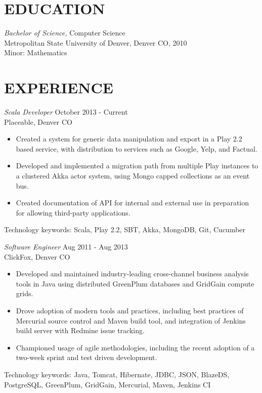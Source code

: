 \documentclass[line,margin]{res}
\begin{document}
\address{2020 Lawrence St \#830, Denver CO 80205}
\address{720-301-4407 / zoe@zgagnon.com}

 
\begin{resume}
 
\section{EDUCATION} {\sl Bachelor of Science,} Computer Science \\
               Metropolitan State University of Denver, Denver CO, 2010 \\
               Minor: Mathematics
 
\section{EXPERIENCE}
{\sl Scala Developer} \hfil October 2013 - Current\\
Placeable, Denver CO
\begin{itemize} \itemsep -2pt
\item Created a system for generic data manipulation and export in a Play 2.2 based service, with distribution to services such as Google, Yelp, and Factual.
\item Developed and implemented a migration path from multiple Play instances to a clustered Akka actor system, using Mongo
capped collections as an event bus.
\item Created documentation of API for internal and external use in preparation for allowing third-party applications.
\end{itemize}
Technology keywords: Scala, Play 2.2, SBT, Akka, MongoDB, Git, Cucumber

 {\sl Software Engineer} \hfill Aug 2011 - Aug 2013 \\
	      ClickFox, Denver CO
                 \begin{itemize}  \itemsep -2pt %
                 \item Developed and maintained industry-leading cross-channel business analysis tools in Java using distributed GreenPlum databases and GridGain compute grids.
                \item Drove adoption of modern tools and practices, including best practices of Mercurial source control and Maven build tool, 
                and integration of Jenkins build server with Redmine issue tracking.
   	    \item  Championed usage of agile methodologies, including the recent adoption of a two-week sprint and test driven development.
\end{itemize}
	Technology keywords: Java, Tomcat, Hibernate, JDBC, JSON, BlazeDS, PostgreSQL, GreenPlum, GridGain, Mercurial, Maven, Jenkins CI
                

\end{resume}
\end{document}
